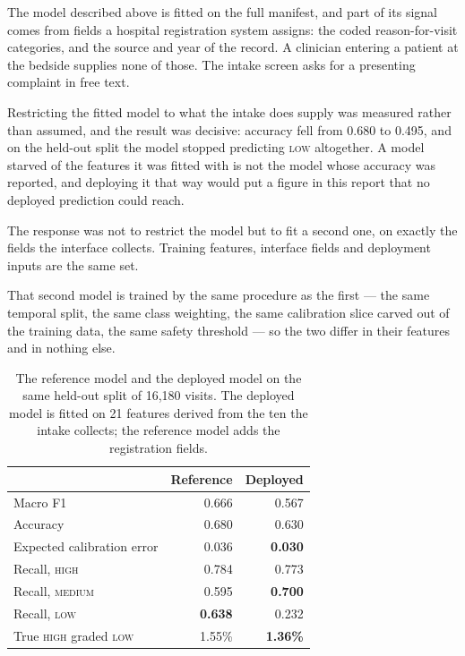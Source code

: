 The model described above is fitted on the full manifest, and part of its signal comes from
fields a hospital registration system assigns: the coded reason-for-visit categories, and the
source and year of the record. A clinician entering a patient at the bedside supplies none of
those. The intake screen asks for a presenting complaint in free text.

Restricting the fitted model to what the intake does supply was measured rather than assumed,
and the result was decisive: accuracy fell from 0.680 to 0.495, and on the held-out split the
model stopped predicting \textsc{low} altogether. A model starved of the features it was fitted
with is not the model whose accuracy was reported, and deploying it that way would put a figure
in this report that no deployed prediction could reach.

\begin{keystatement}
The response was not to restrict the model but to fit a second one, on exactly the fields the
interface collects. Training features, interface fields and deployment inputs are the same set.
\end{keystatement}

That second model is trained by the same procedure as the first --- the same temporal split, the
same class weighting, the same calibration slice carved out of the training data, the same
safety threshold --- so the two differ in their features and in nothing else.

\begin{table}[H]
  \centering
  \small
  \begin{tabular}{lrr}
    \toprule
    & \textbf{Reference} & \textbf{Deployed} \\
    \midrule
    Macro F1                    & 0.666 & 0.567 \\
    Accuracy                    & 0.680 & 0.630 \\
    Expected calibration error  & 0.036 & \textbf{0.030} \\
    Recall, \textsc{high}       & 0.784 & 0.773 \\
    Recall, \textsc{medium}     & 0.595 & \textbf{0.700} \\
    Recall, \textsc{low}        & \textbf{0.638} & 0.232 \\
    True \textsc{high} graded \textsc{low} & 1.55\% & \textbf{1.36\%} \\
    \bottomrule
  \end{tabular}
  \caption{The reference model and the deployed model on the same held-out split of 16,180
    visits. The deployed model is fitted on 21 features derived from the ten the intake
    collects; the reference model adds the registration fields.}
  \label{tab:triage-two-models}
\end{table}

